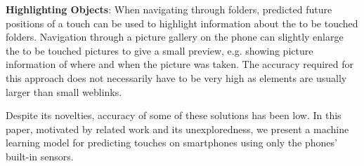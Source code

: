 \textbf{Highlighting Objects}: When navigating through folders, predicted future positions of a touch can be used to highlight information about the to be touched folders. 
	Navigation through a picture gallery on the phone can slightly enlarge the to be touched pictures to give a small preview, e.g. showing picture information of where and when the picture was taken.
	The accuracy required for this approach does not necessarily have to be very high as elements are usually larger than small weblinks.

Despite its novelties, accuracy of some of these solutions has been low. In this paper, motivated by related work and its unexploredness, we present a machine learning model for predicting touches on smartphones using only the phones' built-in sensors.


